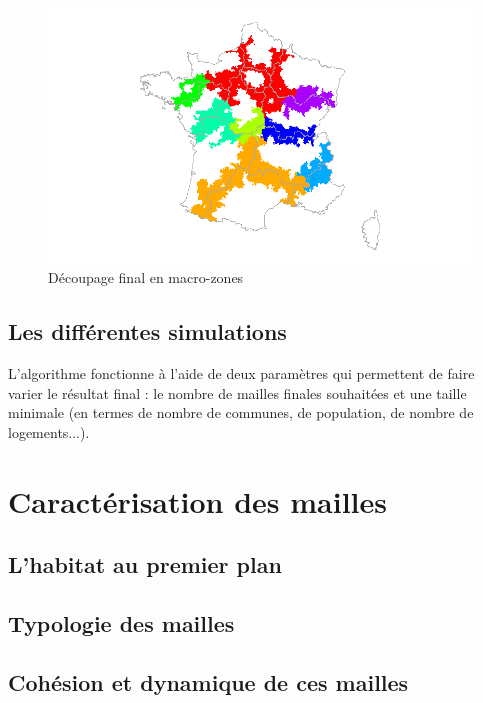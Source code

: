 \documentclass[12pt, a4paper]{article}
\begin{document}
\begin{center}
\begin{figure}[H]
\caption{Découpage final en macro-zones}
\includegraphics[scale=.7]{img/Decoupage.png}
\end{figure}
\end{center}

\subsection{Les différentes simulations}

L'algorithme fonctionne à l'aide de deux paramètres qui permettent de faire varier le résultat final : le nombre de mailles finales souhaitées et une taille minimale (en termes de nombre de communes, de population, de nombre de logements...). 

\section{Caractérisation des mailles}

\subsection{L'habitat au premier plan}

\subsection{Typologie des mailles}

\subsection{Cohésion et dynamique de ces mailles}

\nocite{*}
%
%
\end{document}

